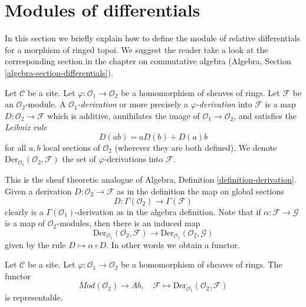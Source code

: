 \section{Modules of differentials}
\label{section-differentials}

\noindent
In this section we briefly explain how to define the module of relative
differentials for a morphism of ringed topoi.
We suggest the reader take a look at the corresponding section
in the chapter on commutative algebra
(Algebra, Section \ref{algebra-section-differentials}).

\begin{definition}
\label{definition-derivation}
Let $\mathcal{C}$ be a site. Let $\varphi : \mathcal{O}_1 \to \mathcal{O}_2$
be a homomorphism of sheaves of rings. Let $\mathcal{F}$
be an $\mathcal{O}_2$-module. A {\it $\mathcal{O}_1$-derivation}
or more precisely a {\it $\varphi$-derivation} into $\mathcal{F}$
is a map $D : \mathcal{O}_2 \to \mathcal{F}$ which is additive, annihilates
the image of $\mathcal{O}_1 \to \mathcal{O}_2$, and satisfies the
{\it Leibniz rule}
$$
D(ab) = aD(b) + D(a)b
$$
for all $a, b$ local sections of $\mathcal{O}_2$
(wherever they are both defined). We denote
$\text{Der}_{\mathcal{O}_1}(\mathcal{O}_2, \mathcal{F})$
the set of $\varphi$-derivations into $\mathcal{F}$.
\end{definition}

\noindent
This is the sheaf theoretic analogue of
Algebra, Definition \ref{definition-derivation}.
Given a derivation $D : \mathcal{O}_2 \to \mathcal{F}$
as in the definition the map on global sections
$$
D : \Gamma(\mathcal{O}_2) \longrightarrow \Gamma(\mathcal{F})
$$
clearly is a $\Gamma(\mathcal{O}_1)$-derivation as in
the algebra definition. Note that if $\alpha : \mathcal{F} \to \mathcal{G}$
is a map of $\mathcal{O}_2$-modules, then there is an induced map
$$
\text{Der}_{\mathcal{O}_1}(\mathcal{O}_2, \mathcal{F})
\longrightarrow
\text{Der}_{\mathcal{O}_1}(\mathcal{O}_2, \mathcal{G})
$$
given by the rule $D \mapsto \alpha \circ D$. In other words
we obtain a functor.

\begin{lemma}
\label{lemma-universal-module}
Let $\mathcal{C}$ be a site. Let $\varphi : \mathcal{O}_1 \to \mathcal{O}_2$
be a homomorphism of sheaves of rings. The functor
$$
\textit{Mod}(\mathcal{O}_2) \longrightarrow \textit{Ab}, \quad
\mathcal{F} \longmapsto \text{Der}_{\mathcal{O}_1}(\mathcal{O}_2, \mathcal{F})
$$
is representable.
\end{lemma}

